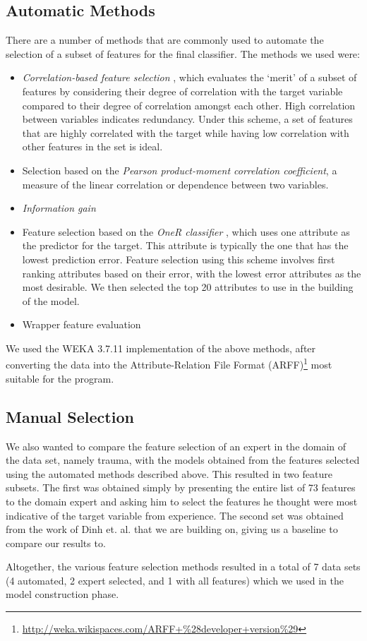 \subsection{Automatic Methods}
There are a number of methods that are commonly used to automate the selection
of a subset of features for the final classifier. The methods we used were:
\begin{itemize}
  \item \textit{Correlation-based feature selection} \citep{Hall2000},
  which evaluates the `merit' of a
  subset of features by considering their degree of correlation with the target
  variable compared to their degree of correlation amongst each other. High
  correlation between variables indicates redundancy. Under
  this scheme, a set of features that are highly correlated with the target
  while having low correlation with other features in the set is ideal.
  \item Selection based on the
  \textit{Pearson product-moment correlation coefficient}, a measure of the
  linear correlation or dependence between two variables.
  \item \textit{Information gain} 
  \item Feature selection based on the \textit{OneR classifier}
  \citep{Holte1993}, which uses one
  attribute as the predictor for the target. This attribute is typically the one
  that has the lowest prediction error. Feature selection using this scheme
  involves first ranking attributes based on their error, with the lowest error
  attributes as the most desirable. We then selected the top 20 attributes to
  use in the building of the model.
  \item Wrapper feature evaluation 
\end{itemize}

We used the WEKA 3.7.11 \citep{Hall2009} implementation of the above
methods, after converting the data into the Attribute-Relation File Format
(ARFF)\footnote{\url{http://weka.wikispaces.com/ARFF+\%28developer+version\%29}}
most suitable for the program.

\subsection{Manual Selection}
We also wanted to compare the feature selection of an expert in the domain
of the data set, namely trauma, with the models obtained from the features
selected using the automated methods described above. This resulted in two
feature subsets. The first was obtained simply by presenting the entire list
of 73 features to the domain expert and asking him to select the features he
thought were most indicative of the target variable from experience. The
second set was obtained from the work of Dinh et. al. \citep{Dinh2013a} that
we are building on, giving us a baseline to compare our results to.

Altogether, the various feature selection methods resulted in a total of
7 data sets (4 automated, 2 expert selected, and 1 with all features) which
we used in the model construction phase.
